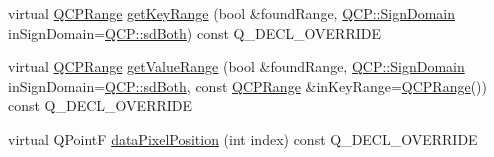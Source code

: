 \begin{DoxyCompactItemize}
virtual \mbox{\hyperlink{class_q_c_p_range}{Q\+C\+P\+Range}} \mbox{\hyperlink{class_q_c_p_bars_ac5a3854774d9d9cd129b1eae1426de2d}{get\+Key\+Range}} (bool \&found\+Range, \mbox{\hyperlink{namespace_q_c_p_afd50e7cf431af385614987d8553ff8a9}{Q\+C\+P\+::\+Sign\+Domain}} in\+Sign\+Domain=\mbox{\hyperlink{namespace_q_c_p_afd50e7cf431af385614987d8553ff8a9aa38352ef02d51ddfa4399d9551566e24}{Q\+C\+P\+::sd\+Both}}) const Q\+\_\+\+D\+E\+C\+L\+\_\+\+O\+V\+E\+R\+R\+I\+DE
\item 
virtual \mbox{\hyperlink{class_q_c_p_range}{Q\+C\+P\+Range}} \mbox{\hyperlink{class_q_c_p_bars_a02cee4bf94d48a1e5f6fc185d9a10477}{get\+Value\+Range}} (bool \&found\+Range, \mbox{\hyperlink{namespace_q_c_p_afd50e7cf431af385614987d8553ff8a9}{Q\+C\+P\+::\+Sign\+Domain}} in\+Sign\+Domain=\mbox{\hyperlink{namespace_q_c_p_afd50e7cf431af385614987d8553ff8a9aa38352ef02d51ddfa4399d9551566e24}{Q\+C\+P\+::sd\+Both}}, const \mbox{\hyperlink{class_q_c_p_range}{Q\+C\+P\+Range}} \&in\+Key\+Range=\mbox{\hyperlink{class_q_c_p_range}{Q\+C\+P\+Range}}()) const Q\+\_\+\+D\+E\+C\+L\+\_\+\+O\+V\+E\+R\+R\+I\+DE
\item 
virtual Q\+PointF \mbox{\hyperlink{class_q_c_p_bars_a55cdaf565cd3384158d1f7f89533bc2d}{data\+Pixel\+Position}} (int index) const Q\+\_\+\+D\+E\+C\+L\+\_\+\+O\+V\+E\+R\+R\+I\+DE
\end{DoxyCompactItemize}
